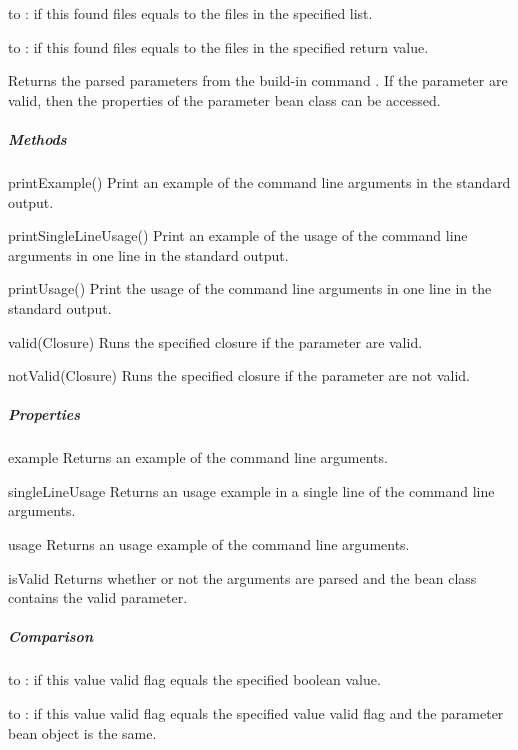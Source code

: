 \begin{compactitem}
%
\item to : if this found files equals to the files in the specified
list.
%
\item to : if this found files equals to the files in the specified
return value.
%
\end{compactitem}

\label{par:parametervalue}

Returns the parsed parameters from the build-in command .
If the parameter are valid, then the properties of the parameter bean class
can be accessed.

\subparagraph{Methods}

\begin{asparadesc}
%
\item[printExample()] Print an example of the command line arguments in the
standard output.
%
\item[printSingleLineUsage()] Print an example of the usage of the command
line arguments in one line in the standard output.
%
\item[printUsage()] Print the usage of the command line arguments in one line in the standard
output.
%
\item[valid(Closure)] Runs the specified closure if the parameter are valid.
%
\item[notValid(Closure)] Runs the specified closure if the parameter are not valid.
%
\end{asparadesc}

\subparagraph{Properties}

\begin{asparadesc}
%
\item[example] Returns an example of the command line arguments.
%
\item[singleLineUsage] Returns an usage example in a single line of the
command line arguments.
%
\item[usage] Returns an usage example of the command line arguments.
%
\item[isValid] Returns whether or not the arguments are parsed and the bean class
contains the valid parameter.
%
\end{asparadesc}

\subparagraph{Comparison}

\begin{compactitem}
%
\item to : if this value valid flag equals the specified boolean value.
%
\item to : if this value valid flag equals the specified value valid
flag and the parameter bean object is the same.
%
\end{compactitem}


